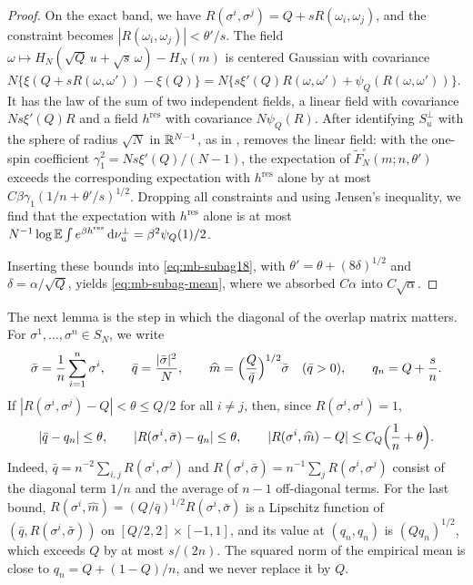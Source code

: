 \begin{proof}
On the exact band, we have $R(\sigma^i,\sigma^j)=Q+sR(\omega_i,\omega_j)$, and the constraint becomes $|R(\omega_i,\omega_j)|<\theta'/s$. The field $\omega\mapsto H_N(\sqrt Q\,u+\sqrt s\,\omega)-H_N(m)$ is centered Gaussian with covariance $N\{\xi(Q+sR(\omega,\omega'))-\xi(Q)\}=N\{s\xi'(Q)R(\omega,\omega')+\psi_Q(R(\omega,\omega'))\}$. It has the law of the sum of two independent fields, a linear field with covariance $Ns\xi'(Q)R$ and a field $h^{\mathrm{res}}$ with covariance $N\psi_Q(R)$. After identifying $S_u^\perp$ with the sphere of radius $\sqrt N$ in $\mathbb R^{N-1}$, as in \cite[Eq.~(2.4)]{Subag2024}, \cite[Lemma~19, Eq.~(2.5)]{Subag2024} removes the linear field: with the one-spin coefficient $\gamma_1^2=Ns\xi'(Q)/(N-1)$, the expectation of $\widetilde F_N^\circ(m;n,\theta')$ exceeds the corresponding expectation with $h^{\mathrm{res}}$ alone by at most $C\beta\gamma_1(1/n+\theta'/s)^{1/2}$. Dropping all constraints and using Jensen's inequality, we find that the expectation with $h^{\mathrm{res}}$ alone is at most $N^{-1}\log\mathbb E\int e^{\beta h^{\mathrm{res}}}\,\mathrm d\nu_u^\perp=\beta^2\psi_Q(1)/2$.

Inserting these bounds into \eqref{eq:mb-subag18}, with $\theta'=\theta+(8\delta)^{1/2}$ and $\delta=\alpha/\sqrt Q$, yields \eqref{eq:mb-subag-mean}, where we absorbed $C\alpha$ into $C\sqrt\alpha$.
\end{proof}

The next lemma is the step in which the diagonal of the overlap matrix matters. For $\sigma^1,\dots,\sigma^n\in S_N$, we write
\begin{equation}\label{eq:mb-mean}
\bar\sigma=\frac1n\sum_{i=1}^n\sigma^i,\qquad \bar q=\frac{|\bar\sigma|^2}N,\qquad \widehat m=\Bigl(\frac Q{\bar q}\Bigr)^{1/2}\bar\sigma\quad(\bar q>0),\qquad q_n=Q+\frac sn .
\end{equation}
If $|R(\sigma^i,\sigma^j)-Q|<\theta\le Q/2$ for all $i\neq j$, then, since $R(\sigma^i,\sigma^i)=1$,
\begin{equation}\label{eq:mb-diagonal}
|\bar q-q_n|\le\theta,\qquad |R(\sigma^i,\bar\sigma)-q_n|\le\theta,\qquad |R(\sigma^i,\widehat m)-Q|\le C_Q\Bigl(\frac1n+\theta\Bigr).
\end{equation}
Indeed, $\bar q=n^{-2}\sum_{i,j}R(\sigma^i,\sigma^j)$ and $R(\sigma^i,\bar\sigma)=n^{-1}\sum_jR(\sigma^i,\sigma^j)$ consist of the diagonal term $1/n$ and the average of $n-1$ off-diagonal terms. For the last bound, $R(\sigma^i,\widehat m)=(Q/\bar q)^{1/2}R(\sigma^i,\bar\sigma)$ is a Lipschitz function of $(\bar q,R(\sigma^i,\bar\sigma))$ on $[Q/2,2]\times[-1,1]$, and its value at $(q_n,q_n)$ is $(Qq_n)^{1/2}$, which exceeds $Q$ by at most $s/(2n)$. The squared norm of the empirical mean is close to $q_n=Q+(1-Q)/n$, and we never replace it by $Q$.

